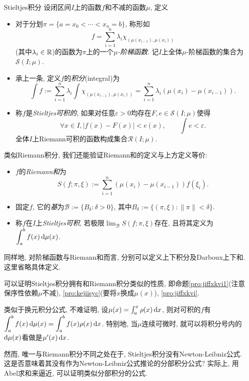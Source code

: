 \begin{definition}{Stieltjes积分}
	设闭区间$I$上的函数$f$和不减的函数$\mu$, 定义
	\begin{itemize}
		\item 对于分划$\pi = \{ a=x_0<\cdots <x_n=b \}$, 称形如$$f = \sum_{i=1}^{n} \lambda _i \chi _{(\mu (x_{i-1}),\mu (x_{i}))} $$
		(其中$\lambda _i \in \mathbb{R}$)的函数为$\pi$上的一个\textit{$\mu$-阶梯函数}. 记$I$上全体$\mu$-阶梯函数的集合为$\mathcal{S}(I;\mu )$. 
		\item 承上一条, 定义$f$的\textit{积分}(integral)为$$\int f := \sum_{i=1}^{n} \lambda _i \int \chi _{(\mu (x_{i-1}), \mu (x_i))} = \sum_{i=1}^{n} \lambda _i (\mu (x_i)-\mu (x_{i-1})). $$
		\item 称$f$是\textit{Stieltjes可积的}, 如果对任意$\varepsilon >0$均存在$F,e \in \mathcal{S}(I;\mu )$使得$$\forall x \in I,|f(x)-F(x)|<e(x),\qquad \int e < \varepsilon .$$
	全体$I$上Riemann可积的函数构成集合$\mathcal{R}(I;\mu)$. 
	\end{itemize}
	类似Riemann积分, 我们还能验证Riemann和的定义与上方定义等价: 
	\begin{itemize}
		\item $f$的\textit{Riemann和}为$$S(f;\pi ,\xi) := \sum_{i=1}^{n} (\mu(x_i)-\mu(x_{i-1}))f(\xi _i) .$$
		\item 固定$f$, 它的\textit{基}为$\mathcal{B} := \{ B_{\delta}:\delta >0 \}$, 其中$B_{\delta} := \{ (\pi ,\xi) : \| \pi \|< \delta \}$. 
		\item 称$f$在$I$上\textit{Stieltjes可积}, 若极限$\displaystyle \lim_{\mathcal{B}} S(f;\pi ,\xi)$存在, 且将其定义为$\displaystyle \int_a^b f(x) \mathop{}\!\mathrm{d} \mu (x)$. 
	\end{itemize}
\end{definition}

同样地, 对阶梯函数与Riemann和而言, 分别可以定义上下积分及Darboux上下和. 这里省略具体定义. 

可以证明Stieltjes积分拥有和Riemann积分类似的性质, 即命题\ref{pro:jiffxkvi1}(注意保序性依赖$\mu$不减), \ref{pro:kejiisyc}(要将$x$换成$\mu (x)$), \ref{pro:jiffxkvi}. 

类似于换元积分公式, 不难证明, 设$\mu (x) = \int_a^x \rho (x)\mathop{}\!\mathrm{d} x$, 则对可积的$f$有$\displaystyle \int_a^b f(x) \mathop{}\!\mathrm{d} \mu (x) = \int_a^b f(x) \rho (x) \mathop{}\!\mathrm{d} x$. 特别地, 当$\mu$连续可微时, 就可以将积分号内的$\mathop{}\!\mathrm{d} \mu (x)$看做是$\mu '(x) \mathop{}\!\mathrm{d} x$. 

然而, 唯一与Riemann积分不同之处在于, Stieltjes积分没有Newton-Leibniz公式. 这是否意味着其没有作为Newton-Leibniz公式推论的分部积分公式? 实际上, 用Abel求和来逼近, 可以证明类似分部积分的公式. 

